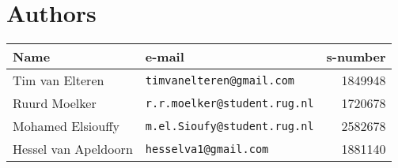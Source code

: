 
\chapter*{Authors}
%
\begin{tabularx}{\textwidth}{lXr}%
\toprule
\bf Name 					& \bf e-mail & \bf s-number \\
\toprule
	Tim van Elteren 		& {\tt timvanelteren@gmail.com} 			& 1849948\\
	Ruurd Moelker 	& {\tt r.r.moelker@student.rug.nl} 			& 1720678\\
	Mohamed Elsiouffy 	& {\tt m.el.Sioufy@student.rug.nl} 			& 2582678\\
	Hessel van Apeldoorn & {\tt hesselva1@gmail.com} 					& 1881140\\
\bottomrule
\end{tabularx}

